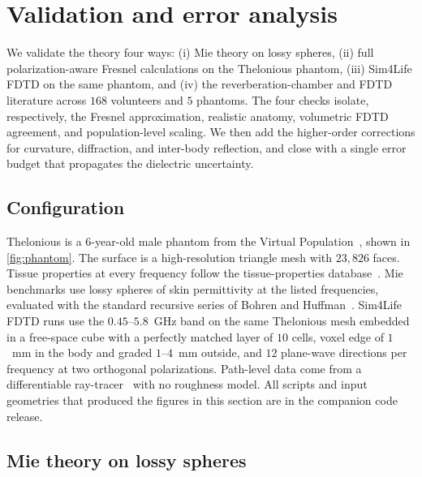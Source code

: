 \documentclass[journal,twocolumn,10pt]{IEEEtran}
\theoremstyle{plain}
\begin{document}
\section{Validation and error analysis}\label{sec:val}

We validate the theory four ways: (i) Mie theory on lossy spheres,
(ii) full polarization-aware Fresnel calculations on the Thelonious
phantom, (iii) Sim4Life FDTD on the same phantom, and (iv) the
reverberation-chamber and FDTD literature across $168$ volunteers
and $5$ phantoms. The four checks isolate, respectively, the
Fresnel approximation, realistic anatomy, volumetric FDTD agreement,
and population-level scaling. We then add the higher-order corrections
for curvature, diffraction, and inter-body reflection, and close with a
single error budget that propagates the dielectric uncertainty.

\subsection{Configuration}\label{subsec:val-setup}

Thelonious is a 6-year-old male phantom from the Virtual
Population~\cite{ITISv5}, shown in \cref{fig:phantom}. The surface is
a high-resolution triangle mesh with $23{,}826$ faces. Tissue
properties at every frequency follow the tissue-properties
database~\cite{ITISv5,Gabriel1996}. Mie
benchmarks use lossy spheres of skin permittivity at the listed
frequencies, evaluated with the standard recursive series of Bohren
and Huffman~\cite{BohrenHuffman1983}. Sim4Life FDTD runs use the
$0.45$--$5.8$~GHz band on the same Thelonious mesh embedded in a
free-space cube with a perfectly matched layer of $10$ cells, voxel
edge of $1$~mm in the body and graded $1$--$4$~mm outside, and
$12$ plane-wave directions per frequency at two orthogonal
polarizations. Path-level data come from a differentiable
ray-tracer~\cite{SionnaRT} with no roughness model. All scripts and
input geometries that produced the figures in this section are in the
companion code release.

\subsection{Mie theory on lossy spheres}\label{subsec:val-mie}
\end{document}
